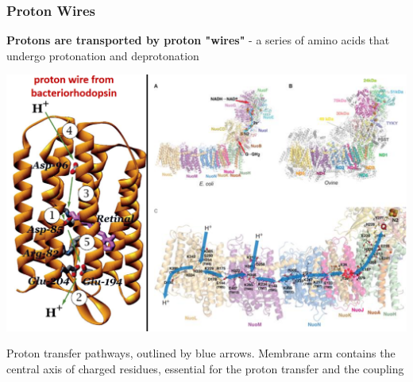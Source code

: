 \documentclass[10pt]{article}
\begin{document}
\subsubsection*{Proton Wires}
\textbf{Protons are transported by proton "wires"} - a series of amino acids that undergo protonation and deprotonation
\begin{center} 
    \includegraphics*[width=\textwidth]{L2_7.png}
\end{center}
Proton transfer pathways, outlined by blue arrows.  Membrane arm contains the central axis of charged residues, essential for the proton transfer and the coupling
\end{document}
